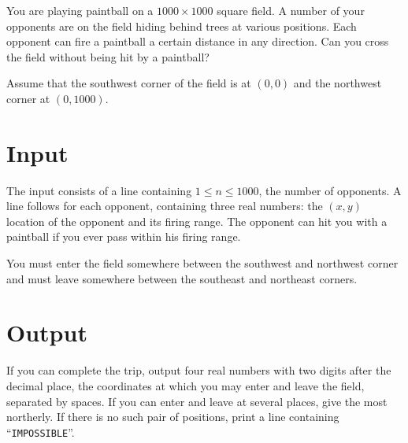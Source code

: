 
You are playing paintball on a $1000\times 1000$ square field.  A number of your opponents are on the
field hiding behind trees at various positions. Each opponent can fire a paintball a certain
distance in any direction. Can you cross the field without being hit by a paintball?

Assume that the southwest corner of the field is at $(0,0)$ and the northwest corner at $(0,1000)$.

\section*{Input}
The input consists of a line containing $1\le n \le 1000$, the number of opponents.  A line follows
for each opponent, containing three real numbers:  the $(x,y)$ location of the opponent and its
firing range.  The opponent can hit you with a paintball if you ever pass within his firing range.

You must enter the field somewhere between the southwest and northwest corner and must leave
somewhere between the southeast and northeast corners.

\section*{Output}
If you can complete the trip, output four real numbers with two digits after the decimal place, the
coordinates at which you may enter and leave the field, separated by spaces.  If you can enter and
leave at several places, give the most northerly.  If there is no such pair of positions, print a
line containing ``\texttt{IMPOSSIBLE}''.
